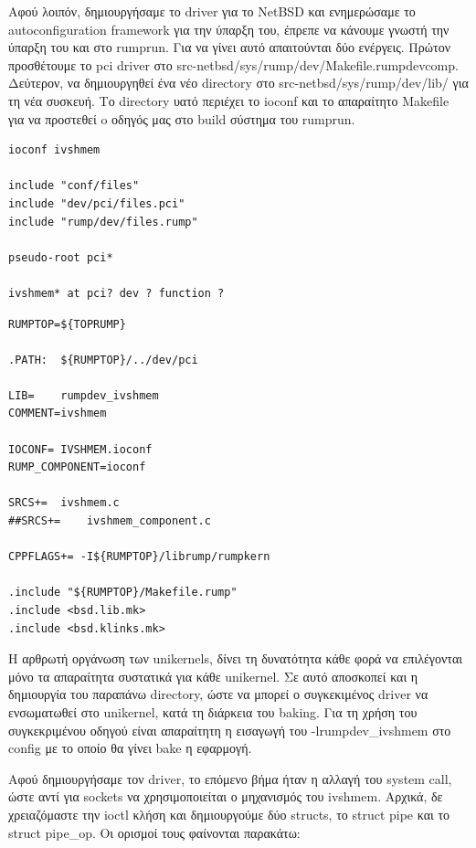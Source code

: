 Αφού λοιπόν, δημιουργήσαμε το driver για το NetBSD και ενημερώσαμε το
autoconfiguration framework για την ύπαρξη του, έπρεπε να κάνουμε γνωστή την
ύπαρξη του και στο rumprun. Για να γίνει αυτό απαιτούνται δύο ενέργεις. Πρώτον
προσθέτουμε το pci driver στο src-netbsd/sys/rump/dev/Makefile.rumpdevcomp.
Δεύτερον, να δημιουργηθεί ένα νέο directory στο src-netbsd/sys/rump/dev/lib/ για
τη νέα συσκευή. Το directory υατό περιέχει το ioconf και το απαραίτητο Makefile
για να προστεθεί o οδηγός μας στο build σύστημα του rumprun. 

\newpage
\begin{lstlisting}[caption={IVSHMEM.ioconf},captionpos=b]
ioconf ivshmem

include "conf/files"
include "dev/pci/files.pci"
include "rump/dev/files.rump"

pseudo-root pci*

ivshmem* at pci? dev ? function ?
\end{lstlisting}

\begin{lstlisting}[caption={rumprun Makefile για το ivshmem},captionpos=b]
RUMPTOP=${TOPRUMP}

.PATH:	${RUMPTOP}/../dev/pci

LIB=	rumpdev_ivshmem
COMMENT=ivshmem

IOCONF=	IVSHMEM.ioconf
RUMP_COMPONENT=ioconf

SRCS+=	ivshmem.c
##SRCS+=	ivshmem_component.c

CPPFLAGS+= -I${RUMPTOP}/librump/rumpkern

.include "${RUMPTOP}/Makefile.rump"
.include <bsd.lib.mk>
.include <bsd.klinks.mk>
\end{lstlisting}

Η αρθρωτή οργάνωση των unikernels, δίνει τη δυνατότητα κάθε φορά να επιλέγονται
μόνο τα απαραίτητα συστατικά για κάθε unikernel. Σε αυτό αποσκοπεί και η
δημιουργία του παραπάνω directory, ώστε να μπορεί ο συγκεκιμένος driver να
ενσωματωθεί στο unikernel, κατά τη διάρκεια του baking. Για τη χρήση του
συγκεκριμένου οδηγού είναι απαραίτητη η εισαγωγή του -lrumpdev\_ivshmem στο
config με το οποίο θα γίνει bake η εφαρμογή. 

Αφού δημιουργήσαμε τον driver, το επόμενο βήμα ήταν η αλλαγή του system call,
ώστε αντί για sockets να χρησιμοποιείται ο μηχανισμός του ivshmem. Αρχικά, δε
χρειαζόμαστε την ioctl κλήση και δημιουργούμε δύο structs, το struct pipe και το
struct pipe\_op. Οι ορισμοί τους φαίνονται παρακάτω:

